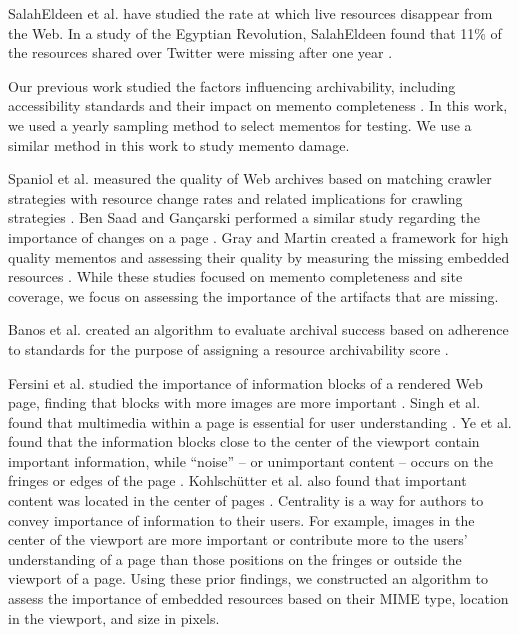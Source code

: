 SalahEldeen et al. have studied the rate at which live resources disappear from the Web. In a study of the Egyptian Revolution, SalahEldeen found that 11\% of the resources shared over Twitter were missing after one year \cite{losingmyrevolution, hanyTPDL2013}. %

Our previous work studied the factors influencing archivability, including accessibility standards and their impact on memento completeness \cite{kellyTPDL2013}. In this work, we used a yearly sampling method to select mementos for testing. We use a similar method in this work to study memento damage.

Spaniol et al. measured the quality of Web archives based on matching crawler strategies with resource change rates and related implications for crawling strategies \cite{spaniol9catch, spaniol2009data, Denev:2009:SFQ:1687627.1687694}. Ben Saad and Gan\c{c}arski performed a similar study regarding the importance of changes on a page \cite{saad2011, saadIJDL, saadTPDL}. Gray and Martin created a framework for high quality mementos and assessing their quality by measuring the missing embedded resources \cite{mementoQuality}. While these studies focused on memento completeness and site coverage, we focus on assessing the importance of the artifacts that are missing. 

Banos et al. created an algorithm to evaluate archival success based on adherence to standards for the purpose of assigning a resource archivability score \cite{ipresArchivability}. 

Fersini et al. studied the importance of information blocks of a rendered Web page, finding that blocks with more images are more important \cite{Fersini20081431}. Singh et al. found that multimedia within a page is essential for user understanding \cite{Singh2009}. Ye et al. found that the information blocks close to the center of the viewport contain important information, while ``noise'' -- or unimportant content -- occurs on the fringes or edges of the page \cite{Yi2003}. Kohlsch\"{u}tter et al. also found that important content was located in the center of pages \cite{boilerPlate}. Centrality is a way for authors to convey importance of information to their users. For example, images in the center of the viewport are more important or contribute more to the users' understanding of a page than those positions on the fringes or outside the viewport of a page. Using these prior findings, we constructed an algorithm to assess the importance of embedded resources based on their MIME type, location in the viewport, and size in pixels.

